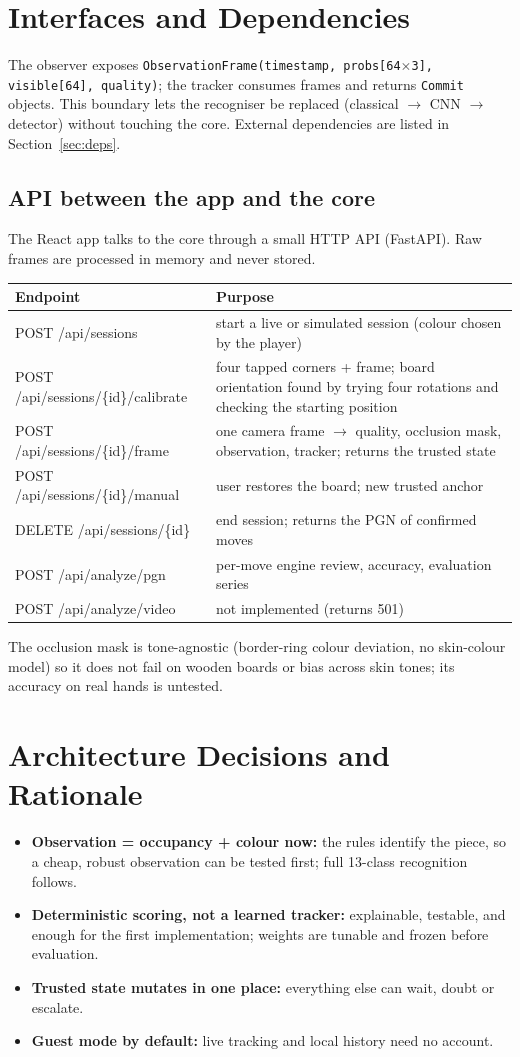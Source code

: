 \section{Interfaces and Dependencies}
The observer exposes \texttt{ObservationFrame(timestamp, probs[64$\times$3], visible[64], quality)}; the tracker
consumes frames and returns \texttt{Commit} objects. This boundary lets the recogniser be replaced (classical $\to$
CNN $\to$ detector) without touching the core. External dependencies are listed in Section~\ref{sec:deps}.

\subsection*{API between the app and the core}
The React app talks to the core through a small HTTP API (FastAPI). Raw frames are processed in memory and never stored.
\begin{longtable}{p{}p{}}
\toprule Endpoint & Purpose\\ \midrule
POST /api/sessions & start a live or simulated session (colour chosen by the player)\\
POST /api/sessions/\{id\}/calibrate & four tapped corners + frame; board orientation found by trying four rotations and checking the starting position\\
POST /api/sessions/\{id\}/frame & one camera frame $\to$ quality, occlusion mask, observation, tracker; returns the trusted state\\
POST /api/sessions/\{id\}/manual & user restores the board; new trusted anchor\\
DELETE /api/sessions/\{id\} & end session; returns the PGN of confirmed moves\\
POST /api/analyze/pgn & per-move engine review, accuracy, evaluation series\\
POST /api/analyze/video & not implemented (returns 501)\\
\bottomrule
\end{longtable}
The occlusion mask is tone-agnostic (border-ring colour deviation, no skin-colour model) so it does not fail on wooden boards or
bias across skin tones; its accuracy on real hands is untested.

\section{Architecture Decisions and Rationale}
\begin{itemize}
\item \textbf{Observation = occupancy + colour now:} the rules identify the piece, so a cheap, robust observation can be tested first; full 13-class recognition follows.
\item \textbf{Deterministic scoring, not a learned tracker:} explainable, testable, and enough for the first implementation; weights are tunable and frozen before evaluation.
\item \textbf{Trusted state mutates in one place:} everything else can wait, doubt or escalate.
\item \textbf{Guest mode by default:} live tracking and local history need no account.
\end{itemize}

